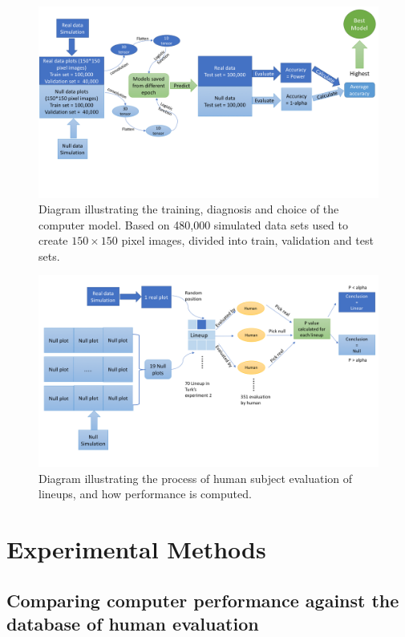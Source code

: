 \documentclass[12pt]{article}
\begin{document}
\begin{figure}[h]
\centerline{\includegraphics[width=15cm]{figures/diagpc.png}}
\caption{Diagram illustrating the training, diagnosis and choice of the computer model. Based on 480,000 simulated data sets used to create $150\times 150$ pixel images, divided into train, validation and test sets.}
\label{dgpc}
\end{figure}

\begin{figure}[h]
\centerline{\includegraphics[width=15cm]{figures/diaghm.png}}
\caption{Diagram illustrating the process of human subject evaluation of lineups, and how performance is computed.}
\label{dghm}
\end{figure}

\section{Experimental Methods}
\label{sec:experiment}

\subsection{Comparing computer performance against the database of human
evaluation}\label{comparing-computer-performance-against-the-database-of-human-evaluation}
\end{document}
